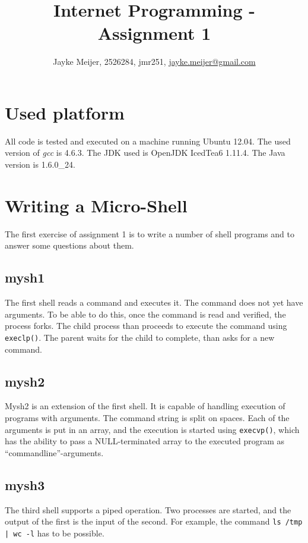 \documentclass[a4paper]{article}
\title{Internet Programming - Assignment 1}
\author{Jayke Meijer, 2526284, jmr251, \url{jayke.meijer@gmail.com}}
\begin{document}
\maketitle

\tableofcontents
\pagebreak

\section{Used platform}

All code is tested and executed on a machine running Ubuntu 12.04. The used version of
\emph{gcc} is 4.6.3. The JDK used is OpenJDK IcedTea6 1.11.4. The Java version is
1.6.0\_24.

\section{Writing a Micro-Shell}

The first exercise of assignment 1 is to write a number of shell programs and to answer
some questions about them.

\subsection{mysh1}

The first shell reads a command and executes it. The command does not yet have arguments.
To be able to do this, once the command is read and verified, the process forks. The child
process than proceeds to execute the command using \texttt{execlp()}. The parent waits for
the child to complete, than asks for a new command.

\subsection{mysh2}

Mysh2 is an extension of the first shell. It is capable of handling execution of programs
with arguments. The command string is split on spaces. Each of the arguments is put in an
array, and the execution is started using \texttt{execvp()}, which has the ability to pass
a NULL-terminated array to the executed program as ``commandline''-arguments.

\subsection{mysh3}

The third shell supports a piped operation. Two processes are started, and the output of
the first is the input of the second. For example, the command \texttt{ls /tmp | wc -l} 
has to be possible.
\end{document}
